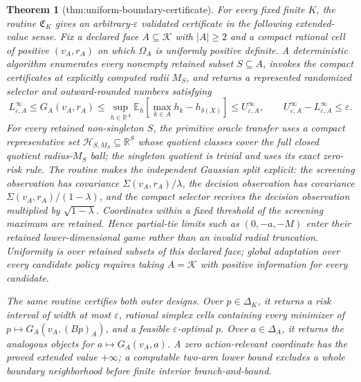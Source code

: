 \documentclass{article}
\newtheorem{theorem}{Theorem}
\begin{document}
\begin{theorem}[thm:uniform-boundary-certificate]\label{thm:uniform-boundary-certificate}
For every fixed finite \(K\), the routine \(\mathfrak C_K\) gives an arbitrary-\(\varepsilon\) validated certificate in the following extended-value sense.  Fix a declared face \(A\subseteq\mathcal K\) with \(|A|\geq2\) and a compact rational cell of positive \((v_A,r_A)\) on which \(\Omega_A\) is uniformly positive definite.  A deterministic algorithm enumerates every nonempty retained subset \(S\subseteq A\), invokes the compact certificates at explicitly computed radii \(M_S\), and returns a represented randomized selector and outward-rounded numbers satisfying
\[
L^{\infty}_{\varepsilon,A}\leq G_A(v_A,r_A)
\leq \sup_{h\in\mathbb R^A}\mathbb E_h\!\left[\max_{k\in A}h_k-h_{\delta(X)}\right]
\leq U^{\infty}_{\varepsilon,A},
\qquad U^{\infty}_{\varepsilon,A}-L^{\infty}_{\varepsilon,A}\leq\varepsilon.
\]
For every retained non-singleton \(S\), the primitive oracle transfer uses a compact representative set \(\mathscr H_{S,M_S}\subseteq\mathbb R^S\) whose quotient classes cover the full closed quotient radius-\(M_S\) ball; the singleton quotient is trivial and uses its exact zero-risk rule.  The routine makes the independent Gaussian split explicit: the screening observation has covariance \(\Sigma(v_A,r_A)/\lambda\), the decision observation has covariance \(\Sigma(v_A,r_A)/(1-\lambda)\), and the compact selector receives the decision observation multiplied by \(\sqrt{1-\lambda}\).  Coordinates within a fixed threshold of the screening maximum are retained.  Hence partial-tie limits such as \((0,-a,-M)\) enter their retained lower-dimensional game rather than an invalid radial truncation.  Uniformity is over retained subsets of this declared face; global adaptation over every candidate policy requires taking \(A=\mathcal K\) with positive information for every candidate.

The same routine certifies both outer designs.  Over \(p\in\Delta_K\), it returns a risk interval of width at most \(\varepsilon\), rational simplex cells containing every minimizer of \(p\mapsto G_A(v_A,(Bp)_A)\), and a feasible \(\varepsilon\)-optimal \(p\).  Over \(a\in\Delta_A\), it returns the analogous objects for \(a\mapsto G_A(v_A,a)\).  A zero action-relevant coordinate has the proved extended value \(+\infty\); a computable two-arm lower bound excludes a whole boundary neighborhood before finite interior branch-and-bound.


\end{theorem}
\end{document}
